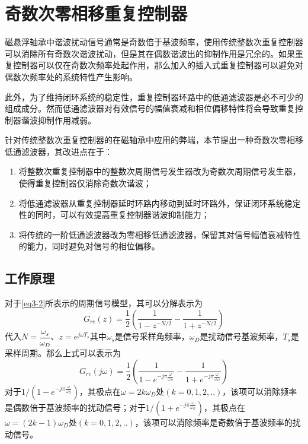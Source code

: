 \section{奇数次零相移重复控制器}
磁悬浮轴承中谐波扰动信号通常是奇数倍于基波频率，使用传统整数次重复控制器可以消除所有奇数次谐波扰动，但是其在偶数谐波出的抑制作用是冗余的。如果重复控制器可以仅在奇数次频率处起作用，那么加入的插入式重复控制器可以避免对偶数次频率处的系统特性产生影响。

此外，为了维持闭环系统的稳定性，重复控制器环路中的低通滤波器是必不可少的组成成分。然而低通滤波器对有效信号的幅值衰减和相位偏移特性将会导致重复控制器谐波抑制作用减弱。

针对传统整数次重复控制器的在磁轴承中应用的弊端，本节提出一种奇数次零相移低通滤波器，其改进点在于：
\begin{enumerate}
	\item 将整数次重复控制器中的整数次周期信号发生器改为奇数次周期信号发生器，使得重复控制器仅消除奇数次谐波；
	\item 将低通滤波器从重复控制器延时环路内移动到延时环路外，保证闭环系统稳定性的同时，可以有效提高重复控制器谐波抑制能力；
	\item 将传统的一阶低通滤波器改为零相移低通滤波器，保留其对信号幅值衰减特性的能力，同时避免对信号的相位偏移。
\end{enumerate}
\subsection{工作原理}
对于\autoref{eq3-2}所表示的周期信号模型，其可以分解表示为
\begin{equation}
G_{rc}(z)=\dfrac{1}{2}\left(\dfrac{1}{1-z^{-N/2}}-\dfrac{1}{1+z^{-N/2}}\right)
\end{equation}
代入$N=\dfrac{\omega_s}{\omega_D}$、$z=e^{j\omega T_s}$其中$\omega_s$是信号采样角频率，$\omega_D$是扰动信号基波频率，$T_s$是采样周期。那么上式可以表示为
\begin{equation}
G_{rc}(j\omega)=\frac{1}{2}\left(\frac{1}{1-e^{-j\pi\frac{\omega}{\omega_D}}}-\frac{1}{1+e^{-j\pi\frac{\omega}{\omega_D}}}\right)
\end{equation}
对于${1}/\left(1-e^{-j\pi\frac{\omega}{\omega_D}}\right)$，其极点在$\omega=2k\omega_D$处$(k=0,1,2,..)$，该项可以消除频率是偶数倍于基波频率的扰动信号；对于${1}/\left(1+e^{-j\pi\frac{\omega}{\omega_D}}\right)$，其极点在$\omega=(2k-1)\omega_D$处$(k=0,1,2,..)$，该项可以消除频率是奇数倍于基波频率的扰动信号。

